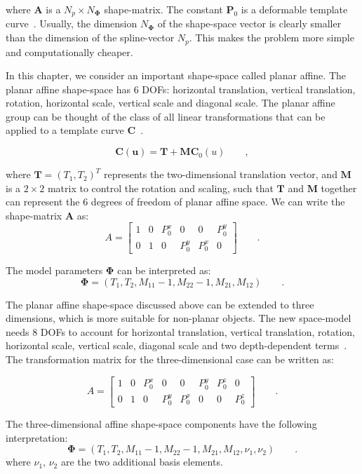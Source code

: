 where $\mathbf{A}$ is a $N_p \times N_{\mathbf{\Phi}}$ shape-matrix. The
constant  $\mathbf{P}_0$ is a deformable template curve~\cite{blake1998active}. Usually, the
dimension $N_{\mathbf{\Phi}}$ of the shape-space vector is clearly
smaller than the dimension of the spline-vector $N_p$. This makes the
problem more simple and computationally cheaper.

In this chapter, we consider an important shape-space called planar
affine. The planar affine shape-space has 6 DOFs: horizontal
translation, vertical translation, rotation, horizontal scale,
vertical scale and diagonal scale. The planar affine group can be
thought of the class of all linear transformations that can be applied
to a template curve $\mathbf{C}$~\cite{blake1998active}. 

\begin{equation}
  \label{eq:4.17}
  \mathbf{C(u)} = \mathbf{T} + \mathbf{M} \mathbf{C}_0(u)\qquad,
\end{equation}

where $\mathbf{T} = (T_1, T_2)^T$ represents the two-dimensional translation
vector, and $\mathbf{M}$ is a $2 \times 2$ matrix to control the rotation and
scaling, such that $\mathbf{T}$ and $\mathbf{M}$ together can represent the 6 degrees of
freedom of planar affine space. We can write the shape-matrix $\mathbf{A}$
as:
\begin{equation}
  \label{eq:4.18}
  A =
  \begin{bmatrix}
    1 & 0 & P_0^x & 0 & 0 & P_0^y\\
    0 & 1 & 0 & P_0^y & P_0^x & 0
  \end{bmatrix}\qquad. 
\end{equation}

The model parameters $\mathbf{\Phi}$ can be interpreted as:
\begin{equation}
  \label{eq:4.19}
  \mathbf{\Phi} =  (T_1, T_2, M_{11} - 1, M_{22} - 1, M_{21}, M_{12})\qquad.
\end{equation}

The planar affine shape-space discussed above can be extended to
three dimensions, which is more suitable for
non-planar objects. The new space-model needs 8 DOFs to
account for horizontal
translation, vertical translation, rotation, horizontal scale,
vertical scale, diagonal scale and two depth-dependent terms~\cite{blake1998active}. The transformation matrix for the three-dimensional case
can be written as:

\begin{equation}
  \label{eq:4.20}
  A =
  \begin{bmatrix}
    1 & 0 & P_0^x & 0 & 0 & P_0^y & P_0^z & 0\\
    0 & 1 & 0 & P_0^y & P_0^x & 0 & 0 & P_0^z
  \end{bmatrix} \qquad.
\end{equation}

The three-dimensional affine shape-space components have
the following interpretation:
\begin{equation}
  \label{eq:4.19}
  \mathbf{\Phi} =  (T_1, T_2, M_{11} - 1, M_{22} - 1, M_{21}, M_{12},
  \nu_1, \nu_2) \qquad.
\end{equation}
where $\nu_1$, $\nu_2$ are the two additional basis elements.
